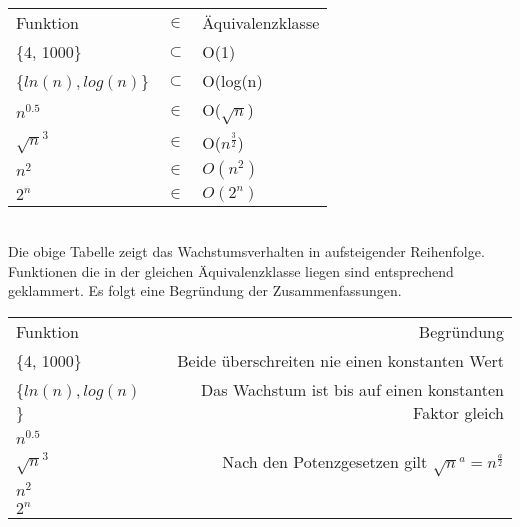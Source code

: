 \begin{tabular}{lcl}
Funktion				& $\in $ 		& Äquivalenzklasse 		\\
\{4, 1000\}				& $\subset$ 	& O(1) 					\\
\{$ln(n), log(n)$\} 	& $\subset$		& O(log(n)				\\
$n^{0.5}$				& $\in$			& O($\sqrt{n}$)			\\
$\sqrt{n}^{3}$			& $\in$			& O($n^{\frac{3}{2}}$)	\\
$n^{2}$					& $\in$			& $O(n^2)$				\\ 
$2^{n}$					& $\in$			& $O(2^n)$				\\ 
\end{tabular} \\

Die obige Tabelle zeigt das Wachstumsverhalten in aufsteigender Reihenfolge.
Funktionen die in der gleichen Äquivalenzklasse liegen sind entsprechend geklammert.
Es folgt eine Begründung der Zusammenfassungen.

\begin{tabular}{l|r}
Funktion				& Begründung \\
\{4, 1000\}				& Beide überschreiten nie einen konstanten Wert \\
\{$ln(n), log(n)$\} 	& Das Wachstum ist bis auf einen konstanten Faktor gleich \\
$n^{0.5}$				&	\\
$\sqrt{n}^{3}$			& Nach den Potenzgesetzen gilt $\sqrt{n}^a = n ^{\frac{a}{2}} $\\
$n^{2}$					& \\ 
$2^{n}$					& \\ 
\end{tabular}

